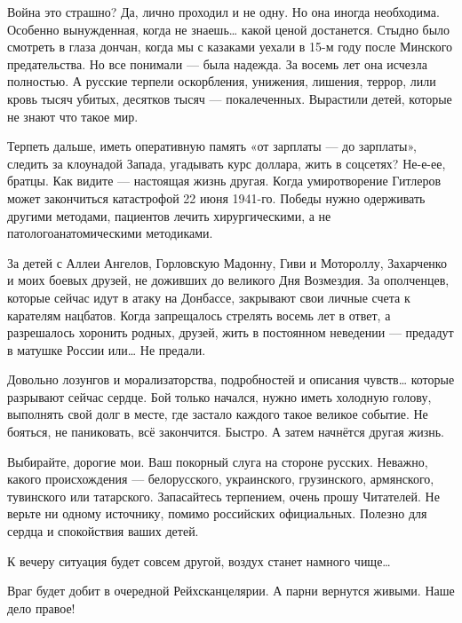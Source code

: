 Война это страшно? Да, лично проходил и не одну. Но она иногда необходима.
Особенно вынужденная, когда не знаешь… какой ценой достанется. Стыдно было
смотреть в глаза дончан, когда мы с казаками уехали в 15-м году после Минского
предательства. Но все понимали — была надежда. За восемь лет она исчезла
полностью. А русские терпели оскорбления, унижения, лишения, террор, лили кровь
тысяч убитых, десятков тысяч — покалеченных. Вырастили детей, которые не знают
что такое мир.

Терпеть дальше, иметь оперативную память «от зарплаты — до зарплаты», следить
за клоунадой Запада, угадывать курс доллара, жить в соцсетях? Не-е-ее, братцы.
Как видите — настоящая жизнь другая. Когда умиротворение Гитлеров может
закончиться катастрофой 22 июня 1941-го. Победы нужно одерживать другими
методами, пациентов лечить хирургическими, а не патологоанатомическими
методиками.

За детей с Аллеи Ангелов, Горловскую Мадонну, Гиви и Мотороллу, Захарченко и
моих боевых друзей, не доживших до великого Дня Возмездия. За ополченцев,
которые сейчас идут в атаку на Донбассе, закрывают свои личные счета к
карателям нацбатов. Когда запрещалось стрелять восемь лет в ответ, а
разрешалось хоронить родных, друзей, жить в постоянном неведении — предадут в
матушке России или… Не предали.

Довольно лозунгов и морализаторства, подробностей и описания чувств… которые
разрывают сейчас сердце. Бой только начался, нужно иметь холодную голову,
выполнять свой долг в месте, где застало каждого такое великое событие. Не
бояться, не паниковать, всё закончится. Быстро. А затем начнётся другая жизнь.

Выбирайте, дорогие мои. Ваш покорный слуга на стороне русских. Неважно, какого
происхождения — белорусского, украинского, грузинского, армянского, тувинского
или татарского. Запасайтесь терпением, очень прошу Читателей. Не верьте ни
одному источнику, помимо российских официальных. Полезно для сердца и
спокойствия ваших детей.

К вечеру ситуация будет совсем другой, воздух станет намного чище…

Враг будет добит в очередной Рейхсканцелярии. А парни вернутся живыми. Наше
дело правое!
